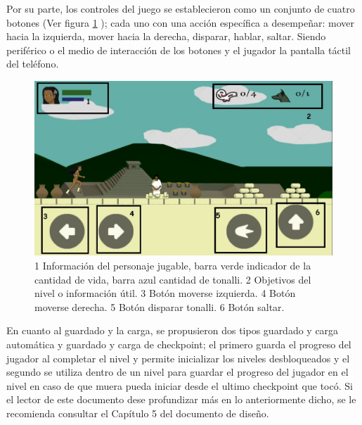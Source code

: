 \par
Por su parte, los controles del juego se establecieron como un conjunto de cuatro botones (Ver figura \ref{fig:GUI} ); cada uno con una acción específica a desempeñar: mover hacia la izquierda, mover hacia la derecha, disparar, hablar, saltar. Siendo periférico o el medio de interacción de los botones y el jugador la pantalla táctil del teléfono.  

\begin{figure}
				\centering
				\includegraphics[height=0.3 \textheight]{05TrabajoRealizado/01DocDiseno02/imagenes/ControlCorrerDer}
				\caption{1 Información del personaje jugable, barra verde indicador de la cantidad de vida, barra azul cantidad de tonalli. 2 Objetivos del nivel o información útil. 3 Botón moverse izquierda. 4 Botón moverse derecha. 5 Botón disparar tonalli. 6 Botón saltar.}
				\label{fig:GUI}
\end{figure}


\par
En cuanto al guardado y la carga, se propusieron dos tipos guardado y carga automática y guardado y carga de checkpoint; el primero guarda el progreso del jugador al completar el nivel y permite inicializar los niveles desbloqueados y el segundo se utiliza dentro de un nivel para guardar el progreso del jugador en el nivel en caso de que muera pueda iniciar desde el ultimo checkpoint que tocó.    Si el lector de este documento dese profundizar más en lo anteriormente dicho, se le recomienda consultar el Capítulo 5 del documento de diseño.